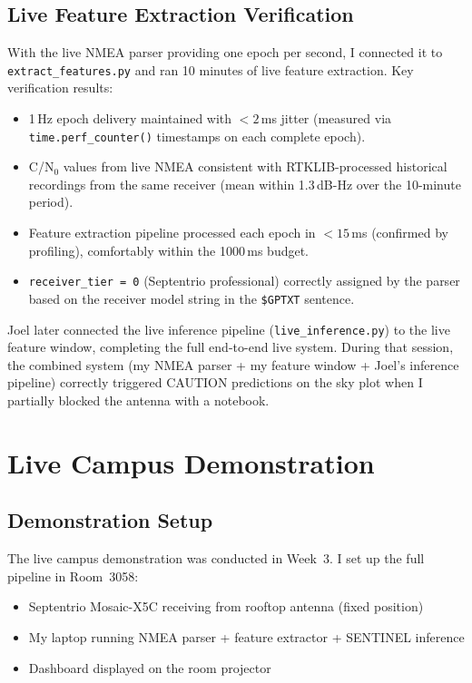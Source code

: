 \documentclass[12pt,a4paper]{article}
\newcommand{\code}[1]{\texttt{#1}}
\begin{document}
\subsection{Live Feature Extraction Verification}

With the live NMEA parser providing one epoch per second, I connected it to
\code{extract\_features.py} and ran 10 minutes of live feature extraction.
Key verification results:

\begin{itemize}
  \item 1\,Hz epoch delivery maintained with $< 2$\,ms jitter (measured via
    \code{time.perf\_counter()} timestamps on each complete epoch).
  \item C/N$_0$ values from live NMEA consistent with RTKLIB-processed historical
    recordings from the same receiver (mean within 1.3\,dB-Hz over the 10-minute period).
  \item Feature extraction pipeline processed each epoch in $< 15$\,ms
    (confirmed by profiling), comfortably within the 1000\,ms budget.
  \item \code{receiver\_tier = 0} (Septentrio professional) correctly assigned by
    the parser based on the receiver model string in the \code{\$GPTXT} sentence.
\end{itemize}

Joel later connected the live inference pipeline (\code{live\_inference.py}) to the
live feature window, completing the full end-to-end live system.
During that session, the combined system (my NMEA parser + my feature window +
Joel's inference pipeline) correctly triggered CAUTION predictions on the sky plot
when I partially blocked the antenna with a notebook.

\section{Live Campus Demonstration}

\subsection{Demonstration Setup}

The live campus demonstration was conducted in Week~3.
I set up the full pipeline in Room~3058:

\begin{itemize}
  \item Septentrio Mosaic-X5C receiving from rooftop antenna (fixed position)
  \item My laptop running NMEA parser + feature extractor + SENTINEL inference
  \item Dashboard displayed on the room projector
\end{itemize}
\end{document}
